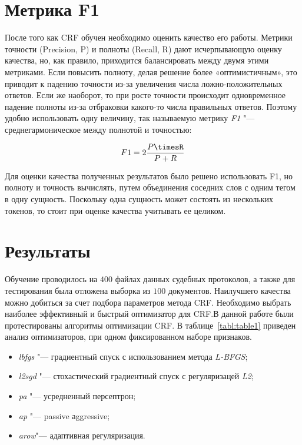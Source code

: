 \documentclass{csmathnotes}
\begin{document}
\section*{Метрика F1}
После того как CRF обучен необходимо оценить качество его работы. Метрики точности (Precision, P) и полноты (Recall, R) дают исчерпывающую оценку качества, но, как правило, приходится балансировать между двумя этими метриками.
Если повысить полноту, делая решение более «оптимистичным», это приводит к падению точности из-за увеличения числа ложно-положительных ответов.
Если же наоборот, то при росте точности происходит одновременное падение полноты из-за отбраковки какого-то числа правильных ответов.
Поэтому удобно использовать одну величину, так называемую метрику \emph{F1} "--- среднегармоническое между полнотой и точностью:

\begin{equation}
F1 = 2\frac{P\timesR}{P + R} 
\end{equation}

Для оценки качества полученных результатов было решено использовать F1, но полноту и точность вычислять, путем объединения соседних слов с одним тегом в одну сущность.
Поскольку одна сущность может состоять из нескольких токенов, то стоит при оценке качества учитывать ее целиком. 

\section*{Результаты}
Обучение проводилось на $400$ файлах данных судебных протоколов, а также для тестирования была отложена выборка из $100$ документов. Наилучшего качества можно добиться за счет подбора параметров метода CRF. Необходимо выбрать наиболее эффективный и быстрый оптимизатор для CRF.В данной работе были протестированы алгоритмы оптимизации CRF. В таблице~\ref{tabl:table1} приведен анализ оптимизаторов, при одном фиксированном наборе признаков. 

\begin{itemize}
    \item \emph{lbfgs} "--- градиентный спуск с использованием метода 
    \emph{L-BFGS};
    \item \emph{l2sgd} "--- стохастический  градиентный спуск \newline с регуляризацей \emph{L2};
    \item \emph{pa} "--- усредненный персептрон;
    \item \emph{ap} "--- passive аggressive;
    \item \emph{arow}"--- адаптивная регуляризация.
\end{itemize}
\end{document}
